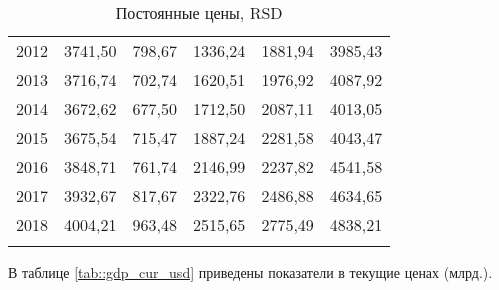\begin{longtable}{|c|c|c|c|c|c|}
	2012 & 3741,50   & 798,67  & 1336,24  & 1881,94  & 3985,43 \\
	2013 & 3716,74   & 702,74  & 1620,51  & 1976,92  & 4087,92 \\
	2014 & 3672,62   & 677,50  & 1712,50  & 2087,11  & 4013,05 \\
	2015 & 3675,54   & 715,47  & 1887,24  & 2281,58  & 4043,47 \\
	2016 & 3848,71   & 761,74  & 2146,99  & 2237,82  & 4541,58 \\
	2017 & 3932,67   & 817,67  & 2322,76  & 2486,88  & 4634,65 \\
	2018 & 4004,21   & 963,48  & 2515,65  & 2775,49  & 4838,21 \\ \hline
	\caption{\label{tab::gdp_const_rsd} Постоянные цены, RSD}
\end{longtable}

В таблице \ref{tab::gdp_cur_usd} приведены показатели в текущие ценах  (млрд.).

